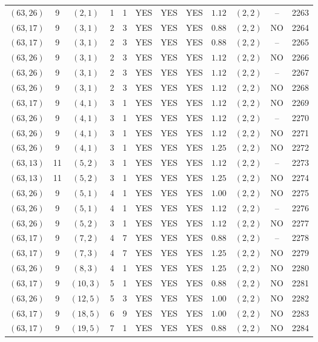 \begin{longtable}{|c|c|c|c|c|c|c|c|c|c|c|c|}
$(63,26)$ & 9 & $(2,1)$ & 1 & 1 & YES & YES & YES & $1.12$ & $(2,2)$ & -- & 2263\\
$(63,17)$ & 9 & $(3,1)$ & 2 & 3 & YES & YES & YES & $0.88$ & $(2,2)$ & NO & 2264\\
$(63,17)$ & 9 & $(3,1)$ & 2 & 3 & YES & YES & YES & $0.88$ & $(2,2)$ & -- & 2265\\
$(63,26)$ & 9 & $(3,1)$ & 2 & 3 & YES & YES & YES & $1.12$ & $(2,2)$ & NO & 2266\\
$(63,26)$ & 9 & $(3,1)$ & 2 & 3 & YES & YES & YES & $1.12$ & $(2,2)$ & -- & 2267\\
$(63,26)$ & 9 & $(3,1)$ & 2 & 3 & YES & YES & YES & $1.12$ & $(2,2)$ & NO & 2268\\
$(63,17)$ & 9 & $(4,1)$ & 3 & 1 & YES & YES & YES & $1.12$ & $(2,2)$ & NO & 2269\\
$(63,26)$ & 9 & $(4,1)$ & 3 & 1 & YES & YES & YES & $1.12$ & $(2,2)$ & -- & 2270\\
$(63,26)$ & 9 & $(4,1)$ & 3 & 1 & YES & YES & YES & $1.12$ & $(2,2)$ & NO & 2271\\
$(63,26)$ & 9 & $(4,1)$ & 3 & 1 & YES & YES & YES & $1.25$ & $(2,2)$ & NO & 2272\\
$(63,13)$ & 11 & $(5,2)$ & 3 & 1 & YES & YES & YES & $1.12$ & $(2,2)$ & -- & 2273\\
$(63,13)$ & 11 & $(5,2)$ & 3 & 1 & YES & YES & YES & $1.25$ & $(2,2)$ & NO & 2274\\
$(63,26)$ & 9 & $(5,1)$ & 4 & 1 & YES & YES & YES & $1.00$ & $(2,2)$ & NO & 2275\\
$(63,26)$ & 9 & $(5,1)$ & 4 & 1 & YES & YES & YES & $1.12$ & $(2,2)$ & -- & 2276\\
$(63,26)$ & 9 & $(5,2)$ & 3 & 1 & YES & YES & YES & $1.12$ & $(2,2)$ & NO & 2277\\
$(63,17)$ & 9 & $(7,2)$ & 4 & 7 & YES & YES & YES & $0.88$ & $(2,2)$ & -- & 2278\\
$(63,17)$ & 9 & $(7,3)$ & 4 & 7 & YES & YES & YES & $1.25$ & $(2,2)$ & NO & 2279\\
$(63,26)$ & 9 & $(8,3)$ & 4 & 1 & YES & YES & YES & $1.25$ & $(2,2)$ & NO & 2280\\
$(63,17)$ & 9 & $(10,3)$ & 5 & 1 & YES & YES & YES & $0.88$ & $(2,2)$ & NO & 2281\\
$(63,26)$ & 9 & $(12,5)$ & 5 & 3 & YES & YES & YES & $1.00$ & $(2,2)$ & NO & 2282\\
$(63,17)$ & 9 & $(18,5)$ & 6 & 9 & YES & YES & YES & $1.00$ & $(2,2)$ & NO & 2283\\
$(63,17)$ & 9 & $(19,5)$ & 7 & 1 & YES & YES & YES & $0.88$ & $(2,2)$ & NO & 2284\\

\end{longtable}
